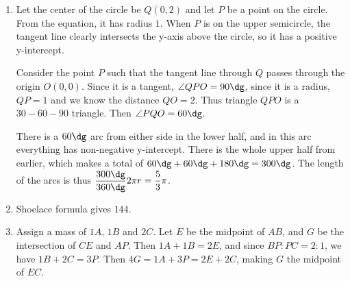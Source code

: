 \documentclass[10pt,paper=letter]{scrartcl}
\begin{document}
\begin{enumerate}

\item Let the center of the circle be $Q(0, 2)$ and let $P$ be a point on the circle. From the equation, it has radius $1$. When $P$ is on the upper semicircle, the tangent line clearly intersects the y-axis above the circle, so it has a positive y-intercept.

Consider the point $P$ such that the tangent line through $Q$ passes through the origin $O(0, 0)$. Since it is a tangent, $\angle QPO = 90\dg$, since it is a radius, $QP = 1$ and we know the distance $QO = 2$. Thus triangle $QPO$ is a $30-60-90$ triangle. Then $\angle PQO = 60\dg$.

There is a $60\dg$ arc from either side in the lower half, and in this arc everything has non-negative y-intercept. There is the whole upper half from earlier, which makes a total of $60\dg + 60\dg + 180\dg = 300\dg$. The length of the arcs is thus $\dfrac{300\dg}{360\dg} 2\pi r = \dfrac53 \pi$.

\item Shoelace formula gives $144$.

\item Assign a mass of $1A$, $1B$ and $2C$. Let $E$ be the midpoint of $AB$, and $G$ be the intersection of $CE$ and $AP$. Then $1A + 1B = 2E$, and since $BP : PC = 2 : 1$, we have $1B + 2C = 3P$. Then $4G = 1A + 3P = 2E + 2C$, making $G$ the midpoint of $EC$.

\end{enumerate}
\end{document}
